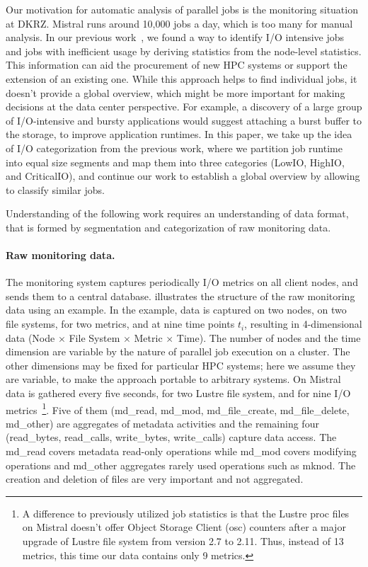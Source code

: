 \documentclass{jhps}
\begin{document}
Our motivation for automatic analysis of parallel jobs is the monitoring situation at DKRZ.
Mistral runs around 10,000 jobs a day, which is too many for manual analysis.
In our previous work~\cite{iocats2020}, we found a way to identify I/O intensive jobs and jobs with inefficient usage by deriving statistics from the node-level statistics.
This information can aid the procurement of new HPC systems or support the extension of an existing one.
While this approach helps to find individual jobs, it doesn't provide a global overview, which might be more important for making decisions at the data center perspective.
For example, a discovery of a large group of I/O-intensive and bursty applications would suggest attaching a burst buffer to the storage, to improve application runtimes.
In this paper, we take up the idea of I/O categorization from the previous work, where we partition job runtime into equal size segments and map them into three categories (LowIO, HighIO, and CriticalIO), and continue our work to establish a global overview by allowing to classify similar jobs.

Understanding of the following work requires an understanding of data format, that is formed by segmentation and categorization of raw monitoring data.

\paragraph{Raw monitoring data.}
The monitoring system captures periodically I/O metrics on all client nodes, and sends them to a central database.
 illustrates the structure of the raw monitoring data using an example.
In the example, data is captured on two nodes, on two file systems, for two metrics, and at nine time points $t_i$, resulting in 4-dimensional data (Node $\times$ File System $\times$ Metric $\times$ Time).
The number of nodes and the time dimension are variable by the nature of parallel job execution on a cluster.
The other dimensions may be fixed for particular HPC systems; here we assume they are variable, to make the approach portable to arbitrary systems.
On Mistral data is gathered every five seconds, for two Lustre file system, and for nine I/O metrics~\footnote{A difference to previously utilized job statistics is that the Lustre proc files on Mistral doesn't offer Object Storage Client (osc) counters after a major upgrade of Lustre file system from version 2.7 to 2.11.
Thus, instead of 13 metrics, this time our data contains only 9 metrics.}.
Five of them (md\_read, md\_mod, md\_file\_create, md\_file\_delete, md\_other) are aggregates of metadata activities and the remaining four (read\_bytes, read\_calls, write\_bytes, write\_calls) capture data access.
The md\_read covers metadata read-only operations while md\_mod covers modifying operations and md\_other aggregates rarely used operations such as mknod.
The creation and deletion of files are very important and not aggregated.
\end{document}
